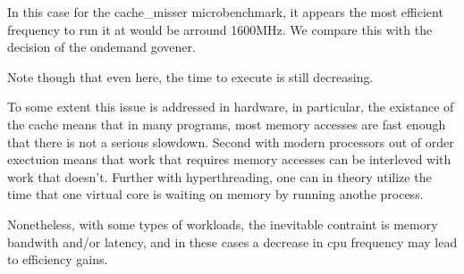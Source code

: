 In this case for the cache\_misser microbenchmark, it appears the most efficient frequency to run it at would be arround 1600MHz. We compare this with the decision of the ondemand govener.

Note though that even here, the time to execute is still decreasing.

To some extent this issue is addressed in hardware, in particular, the existance of the cache means that in many programs, most memory accesses are fast enough that there is not a serious slowdown. Second with modern processors out of order exectuion means that work that requires memory accesses can be interleved with work that doesn't. Further with hyperthreading, one can in theory utilize the time that one virtual core is waiting on memory by running anothe process.

Nonetheless, with some types of workloads, the inevitable contraint is memory bandwith and/or latency, and in these cases a decrease in cpu frequency may lead to efficiency gains.

